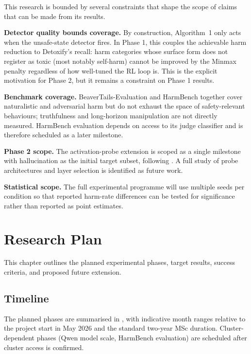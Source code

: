 \documentclass[a4paper,twoside,12pt]{report}
\begin{document}
This research is bounded by several constraints that shape the scope of claims that can be
made from its results.

\textbf{Detector quality bounds coverage.} By construction, Algorithm~1 only acts when the
unsafe-state detector fires. In Phase 1, this couples the achievable harm reduction to
Detoxify's recall: harm categories whose surface form does not register as toxic (most
notably self-harm) cannot be improved by the Minmax penalty regardless of how well-tuned
the RL loop is. This is the explicit motivation for Phase 2, but it remains a constraint on
Phase 1 results.

\textbf{Benchmark coverage.} BeaverTails-Evaluation and HarmBench together cover
naturalistic and adversarial harm but do not exhaust the space of safety-relevant
behaviours; truthfulness and long-horizon manipulation are not directly measured. HarmBench
evaluation depends on access to its judge classifier and is therefore scheduled as a later
milestone.

\textbf{Phase 2 scope.} The activation-probe extension is scoped as a single milestone with
hallucination as the initial target subset, following \citet{rateike2023}. A full study of
probe architectures and layer selection is identified as future work.

\textbf{Statistical scope.} The full experimental programme will use multiple seeds per
condition so that reported harm-rate differences can be tested for significance rather than
reported as point estimates.

\chapter{Research Plan}
\label{ch:plan}

This chapter outlines the planned experimental phases, target results, success criteria, and
proposed future extension.

\section{Timeline}

The planned phases are summarised in , with indicative month ranges
relative to the project start in May 2026 and the standard two-year MSc duration.
Cluster-dependent phases (Qwen model scale, HarmBench evaluation) are scheduled after
cluster access is confirmed.
\end{document}
